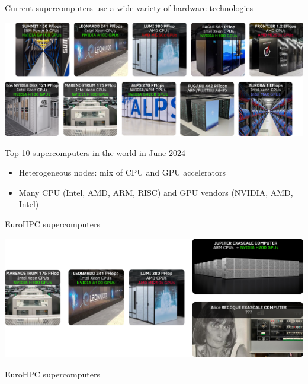 \documentclass[aspectratio=169]{beamer}
\renewcommand{\caption}[1]{%
    \begin{center}
        \scriptsize #1
    \end{center}%
}
\begin{document}
\begin{frame}{Current supercomputers use a wide variety of hardware technologies}
    \begin{center}
        \includegraphics[width=1\textwidth]{top10_super_computers.png}

        \caption{Top 10 supercomputers in the world in June 2024}
    \end{center}

    \begin{itemize}
    \item Heterogeneous nodes: mix of CPU and GPU accelerators
    \item Many CPU (Intel, AMD, ARM, RISC) and GPU vendors (NVIDIA, AMD, Intel)
    \end{itemize}
\end{frame}


\begin{frame}{EuroHPC supercomputers}
    \begin{center}
        \includegraphics[width=1\textwidth]{euroHPC.png}

        \caption{EuroHPC supercomputers}
    \end{center}
\end{frame}

\end{document}
